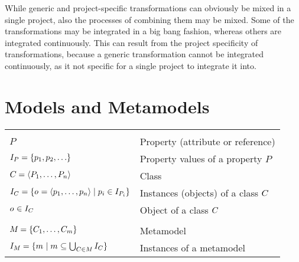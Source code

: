 While generic and project-specific transformations can obviously be mixed in a single project, also the processes of combining them may be mixed.
Some of the transformations may be integrated in a big bang fashion, whereas others are integrated continuously.
This can result from the project specificity of transformations, because a generic transformation cannot be integrated continuously, as it not specific for a single project to integrate it into.


\section{Models and Metamodels}
\label{chap:networks:models}

\begin{table}
    \centering
    \small
    \renewcommand{\arraystretch}{1.4}%
    \begin{tabular}{R{4.8cm} L{5cm}}
        \toprule
        \rowcolor{\headinglinecolor}
        \\
        $P$
            & Property (attribute or reference) \\
        $\instances{P} = \setted{p_1, p_2, \dots}$     
            & Property values of a property $P$ \\
        $\class{C}{} = \tupled{P_1, \dots, P_n}$
            & Class \\
        $\instances{\class{C}{}} = \setted{\object{o}{} = \tupled{p_1, \dots, p_n} \mid p_i \in \instances{P_i}}$ 
            & Instances (objects) of a class $\class{C}{}$\\
        $\object{o}{} \in \instances{\class{C}{}}$
            & Object of a class $\class{C}{}$ \\
        \midrule
        \rowcolor{\headinglinecolor}
        \\
        $\metamodel{M}{} = \setted{\class{C}{1}, \dots, \class{C}{m}}$
            & Metamodel\\
        $\metamodelinstanceset{M}{} = \setted{\model{m}{} \mid \model{m}{} \subseteq \bigcup_{\class{C}{} \in \metamodel{M}{}} \instances{\class{C}{}}}$
            & Instances of a metamodel\\

\end{tabular}
\end{table}
